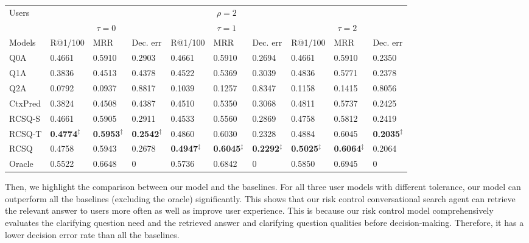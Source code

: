 \documentclass[format=acmsmall, review=False, screen=true]{acmart}
\begin{document}
\begin{table}[t]
{\begin{tabular}{l|l|l|l|l|l|l|l|l|l}
\multirow{2}{*}{Users}  & \multicolumn{9}{c}{$\rho=2$} \\ 
\cline{2-10}  
& \multicolumn{3}{c|}{$\tau=0$} & \multicolumn{3}{c|}{$\tau=1$} & \multicolumn{3}{c}{$\tau=2$} \\ \hline
Models  & R@1/100     & MRR    & Dec. err    & R@1/100     & MRR    & Dec. err    & R@1/100     & MRR    & Dec. err  \\ \hline
Q0A     & 0.4661    & 0.5910    & 0.2903    & 0.4661    & 0.5910    & 0.2694    &  0.4661    & 0.5910    & 0.2350     \\ 
Q1A     & 0.3836    & 0.4513    & 0.4378    & 0.4522    & 0.5369   &  0.3039  & 0.4836    & 0.5771    & 0.2378   \\ 
Q2A     & 0.0792   & 0.0937  & 0.8817    & 0.1039 & 0.1257 & 0.8347  & 0.1158    &0.1415    & 0.8056    \\ 
CtxPred & 0.3824    & 0.4508    & 0.4387   & 0.4510   & 0.5350   & 0.3068  & 0.4811    & 0.5737    & 0.2425            \\ \hline
RCSQ-S &  0.4661   & 0.5905    & 0.2911   & 0.4533 & 0.5560 & 0.2869  & 0.4758  & 0.5812    & 0.2419    \\ 
RCSQ-T &  \textbf{0.4774}$^{\ddag}$  & \textbf{0.5953}$^{\ddag}$  & \textbf{0.2542}$^{\ddag}$   &  0.4860 & 0.6030  & 0.2328 &  0.4884 & 0.6045  & \textbf{0.2035}$^{\ddag}$  \\ 
RCSQ   & 0.4758    & 0.5943   & 0.2678 &  \textbf{0.4947}$^{\ddag}$ &  \textbf{0.6045}$^{\ddag}$ &   \textbf{0.2292}$^{\ddag}$ & \textbf{0.5025}$^{\ddag}$  & \textbf{0.6064}$^{\ddag}$  &  0.2064           \\ \hline
Oracle  & 0.5522    & 0.6648    & 0  &   0.5736  &   0.6842     & 0    & 0.5850    & 0.6945  & 0   \\ \hline\hline

\end{tabular}
}
\label{msdialogpoly}
\end{table}

Then, we highlight the comparison between our model and the baselines. For all three user models with different tolerance, our model can outperform all the baselines (excluding the oracle) significantly. This shows that our risk control conversational search agent can retrieve the relevant answer to users more often as well as improve user experience. This is because our risk control model comprehensively evaluates the clarifying question need and the retrieved answer and clarifying question qualities before decision-making. Therefore, it has a lower decision error rate than all the baselines. 
\end{document}
